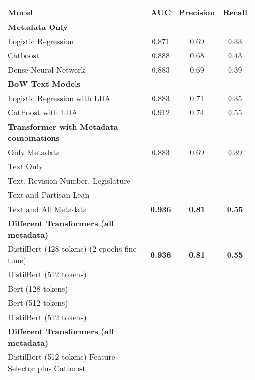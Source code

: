 \documentclass[11pt]{article}
\begin{document}
\begin{tabular}{ l  c  c  c}
 Model & AUC & Precision & Recall  \\
 \hline
 \textbf{Metadata Only} & & & \\
\hspace{3mm}Logistic Regression & 0.871 & 0.69 & 0.33 \\
\hspace{3mm}Catboost  & 0.888 & 0.68 & 0.43 \\
\hspace{3mm} Dense Neural Network & 0.883 &  0.69 & 0.39 \\
\hline
\textbf{BoW Text Models} & & & \\
\hspace{3mm}Logistic Regression with LDA & 0.883 & 0.71 & 0.35 \\
\hspace{3mm}CatBoost with LDA & 0.912 & 0.74 & 0.55 \\ 
\hline
\textbf{Transformer with Metadata combinations} & & & \\
\hspace{3mm}Only Metadata & 0.883 & 0.69 & 0.39 \\
\hspace{3mm}Text Only & & & \\
\hspace{3mm}Text, Revision Number, Legislature & & & \\
\hspace{3mm}Text and Partisan Lean & & & \\
\hspace{3mm}Text and All Metadata & \textbf{ 0.936 }& \textbf{0.81} & \textbf{0.55} \\
\hline
\textbf{Different Transformers (all metadata)} & & & \\
\hspace{3mm}DistilBert (128 tokens) (2 epochs fine-tune) & \textbf{ 0.936 }& \textbf{0.81} & \textbf{0.55} \\
\hspace{3mm}DistilBert (512 tokens)  &  & & \\
\hspace{3mm}Bert (128 tokens) &  & & \\
\hspace{3mm}Bert (512 tokens)  &  & & \\
\hspace{3mm}DistilBert (512 tokens) &  & & \\
\hline
\textbf{Different Transformers (all metadata)} & & & \\
\hspace{3mm}DistilBert (512 tokens) Feature Selector plus Catboost&  & & \\

\end{tabular}
\end{document}
